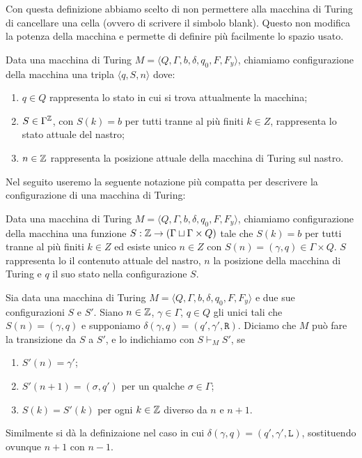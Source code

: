 \begin{osservazione}
 Con questa definizione abbiamo scelto di non permettere alla macchina di Turing
 di cancellare una cella (ovvero di scrivere il simbolo blank).
 Questo non modifica la potenza della macchina e permette di definire più facilmente
 lo spazio usato.
\end{osservazione}


\begin{definizione}
 Data una macchina di Turing $M=\langle Q, \Gamma, b, \delta, q_0, F, F_y \rangle$,
 chiamiamo configurazione della macchina una tripla
 $\langle q, S, n \rangle$ dove:
 \begin{enumerate}
  \item $q \in Q$ rappresenta lo stato in cui si trova attualmente la macchina;
  \item $S \in \Gamma ^ {\mathbb{Z}}$, con $S(k)=b$ per tutti tranne al più finiti $k \in Z$,
  rappresenta lo stato attuale del nastro;
  \item $n \in \mathbb{Z}$ rappresenta la posizione attuale della macchina di Turing
  sul nastro.
 \end{enumerate}
\end{definizione}
Nel seguito useremo la seguente notazione più compatta per descrivere la
configurazione di una macchina di Turing:
\begin{definizione}
\label{def:conf-TM}
 Data una macchina di Turing $M=\langle Q, \Gamma, b, \delta, q_0, F, F_y \rangle$,
 chiamiamo configurazione della macchina una funzione
 $S: \mathbb{Z} \to (\Gamma \sqcup \Gamma \times Q)$  tale che $S(k)=b$ per
 tutti tranne al più finiti $k \in Z$ ed esiste unico $n \in Z$ con
 $S(n) = (\gamma, q) \in \Gamma \times Q$.
 $S$ rappresenta lo il contenuto attuale del nastro, $n$ la posizione della
 macchina di Turing e $q$ il suo stato nella configurazione $S$.
\end{definizione}

\begin{definizione}
 Sia data una macchina di Turing $M=\langle Q, \Gamma, b, \delta, q_0, F, F_y \rangle$
 e due sue configurazioni $S$ e $S'$.
 Siano $n \in \mathbb{Z}$, $\gamma \in \Gamma$, $q \in Q$ gli unici tali che
 $S(n) = (\gamma, q)$ e supponiamo $\delta(\gamma, q) = (q', \gamma', \texttt{R})$.
 Diciamo che
 $M$ può fare la transizione da $S$ a $S'$, e lo indichiamo con $S \vdash_M S'$,
 se 
 \begin{enumerate}
  \item $S'(n)=\gamma'$;
  \item $S'(n+1)=(\sigma, q')$ per un
 qualche $\sigma \in \Gamma$;
  \item $S(k) = S'(k)$ per ogni $k \in \mathbb{Z}$ diverso da
 $n$ e $n+1$.
 \end{enumerate}
 Similmente si dà la definizaione nel caso in cui
 $\delta(\gamma, q) = (q', \gamma', \texttt{L})$,
 sostituendo ovunque $n+1$ con $n-1$.
\end{definizione}

